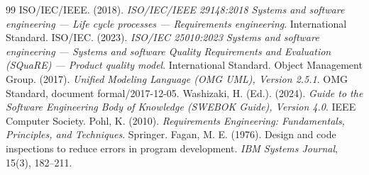 \documentclass[11pt,a4paper,oneside]{article}
\begin{document}
\vspace{4pt}
\renewcommand{\refname}{Referencias}
\begin{thebibliography}{99}
\small
{} ISO/IEC/IEEE. (2018). \textit{ISO/IEC/IEEE 29148:2018 Systems and software engineering --- Life cycle processes --- Requirements engineering}. International Standard.
 ISO/IEC. (2023). \textit{ISO/IEC 25010:2023 Systems and software engineering --- Systems and software Quality Requirements and Evaluation (SQuaRE) --- Product quality model}. International Standard.
 Object Management Group. (2017). \textit{Unified Modeling Language (OMG UML), Version 2.5.1}. OMG Standard, document formal/2017-12-05.
 Washizaki, H. (Ed.). (2024). \textit{Guide to the Software Engineering Body of Knowledge (SWEBOK Guide), Version 4.0}. IEEE Computer Society.
 Pohl, K. (2010). \textit{Requirements Engineering: Fundamentals, Principles, and Techniques}. Springer.
 Fagan, M. E. (1976). Design and code inspections to reduce errors in program development. \textit{IBM Systems Journal}, 15(3), 182--211.
\end{thebibliography}
\end{document}
